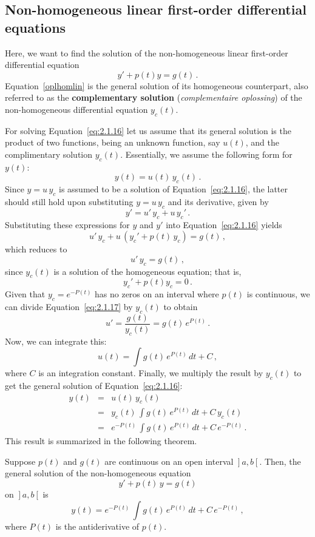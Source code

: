 \subsection{Non-homogeneous linear first-order differential equations}

Here, we want to find the solution of the non-homogeneous linear first-order differential equation
\begin{equation}\label{eq:2.1.16}
y'+p(t)y=g(t)\,.
\end{equation}
Equation~\eqref{oplhomlin} is the general solution of its homogeneous counterpart, also referred to as the \textbf{complementary solution} (\textit{complementaire oplossing}) of the non-homogeneous differential equation $y_c(t)$. 

For solving Equation~\eqref{eq:2.1.16} let us assume that its general solution is the product of two functions, being an unknown function, say $u(t)$, and the complimentary solution $y_c(t)$. Essentially, we assume the following form for $y(t)$:
$$
y(t)=u(t)\,y_c(t)\,.
$$
Since $y=u\,y_c$ is assumed to be a solution of Equation~\eqref{eq:2.1.16}, the latter should still hold upon substituting $y=u\,y_c$ and its derivative, given by
$$
y'=u'\,y_c+u\,y_c'\,.
$$
Substituting these expressions for $y$ and $y'$ into Equation~\eqref{eq:2.1.16}
yields
$$
u'\,y_c+u\,(y_c'+p(t)\,y_c)=g(t)\,,
$$
which reduces to
\begin{equation}\label{eq:2.1.17}
u'\,y_c=g(t)\,,
\end{equation}
since $y_c(t)$ is a solution of the homogeneous equation; that is,
$$
y_c'+p(t)y_c=0\,.
$$
Given that $y_c=e^{-P(t)}$ has no zeros on an interval where $p(t)$ is continuous, we can divide Equation~\eqref{eq:2.1.17} by $y_c(t)$ to obtain
$$
u'=\dfrac{g(t)}{y_c(t)}=g(t)\,e^{P(t)}\,.
$$
Now, we can integrate this:
$$
u(t)=\displaystyle\int g(t)\,e^{P(t)} \, dt+C\,,
$$
where $C$ is an integration constant. Finally, we multiply the result by $y_c(t)$ to get the general solution of Equation~\eqref{eq:2.1.16}:
\begin{eqnarray}
y(t)&=&u(t)\,y_c(t)\nonumber\\
&=&y_c(t)\,\displaystyle\int g(t)\,e^{P(t)} \, dt+C\,y_c(t)\\\nonumber
&=&e^{-P(t)}\,\displaystyle\int g(t)\,e^{P(t)} \, dt + C\,e^{-P(t)}\,.
\end{eqnarray}
This result is summarized in the following theorem.

\begin{theorem}
\label{theolineairhetero}
Suppose  $p(t)$ and $g(t)$ are continuous on an open interval $\left.\right]a,b\left[\right.$. Then, the general solution of the non-homogeneous equation
\begin{equation}\label{eq:2.1.31}
y'+p(t)\,y=g(t)
\end{equation}
 on  $\left.\right]a,b\left[\right.$ is
\begin{equation}
y(t)=e^{-P(t)}\,\displaystyle\int g(t)\,e^{P(t)}\, dt+C\,e^{-P(t)}\,,
\label{oplheterolin}
\end{equation}
where $P(t)$ is the antiderivative of $p(t)$.
\end{theorem}

